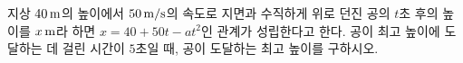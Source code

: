 지상 $40\mkern3mu \mathrm{m}$의 높이에서 $50\mkern3mu \mathrm{m/s}$의 속도로 지면과 수직하게 위로 던진 공의 $t$초 후의 높이를 $x\mkern3mu \mathrm{m}$라 하면 $x=40+50t-at^2$인 관계가 성립한다고 한다. 공이 최고 높이에 도달하는 데 걸린 시간이 $5$초일 때, 공이 도달하는 최고 높이를 구하시오. 
